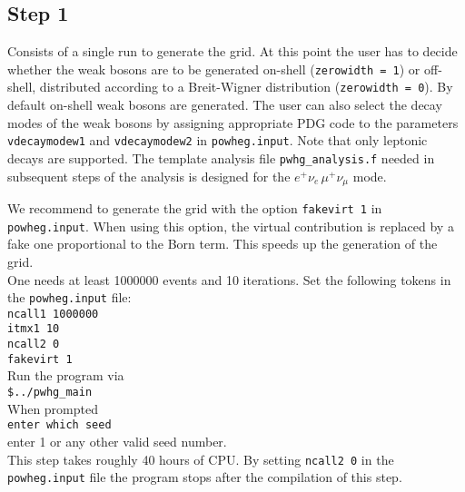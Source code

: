 \documentclass[a4paper,11pt]{article}
\begin{document}
\subsection*{Step 1}
%
Consists of a single run to generate the grid. At this point the user
has to decide whether the weak bosons are to be generated on-shell
({\tt zerowidth = 1}) or off-shell, distributed according to a
Breit-Wigner distribution ({\tt zerowidth = 0}).  By default on-shell
weak bosons are generated. The user can also select the decay modes of
the weak bosons by assigning appropriate PDG code to the parameters
{\tt vdecaymodew1} and {\tt vdecaymodew2} in {\tt powheg.input}. Note
that only leptonic decays are supported. The template analysis file
{\tt pwhg\_analysis.f} needed in subsequent steps of the analysis is
designed for the $e^+\nu_e \,\mu^+\nu_{\mu}$ mode.

We recommend to generate the grid with the option {\tt fakevirt 1} in
{\tt powheg.input}. When using this option, the virtual contribution
is replaced by a fake one proportional to the Born term. This speeds
up the generation of the grid.
\\[2ex]
One needs at least 1000000 events and 10 iterations. Set the following
tokens in the {\tt powheg.input} file:
\\[2ex]
{\tt ncall1 1000000
  \\[2ex]
  itmx1 10
  \\[2ex]
  ncall2 0
  \\[2ex]
  fakevirt 1 }
\\[2ex]
Run the program via
\\[2ex]
{\tt \$../pwhg\_main}
\\[2ex]
When prompted
\\[2ex]
{\tt enter which seed}
\\[2ex]
enter 1 or any other valid seed number.
\\[2ex]
This step takes roughly 40 hours of CPU. By setting {\tt ncall2 0} in
the {\tt powheg.input} file the program stops after the compilation of
this step.

\end{document}
